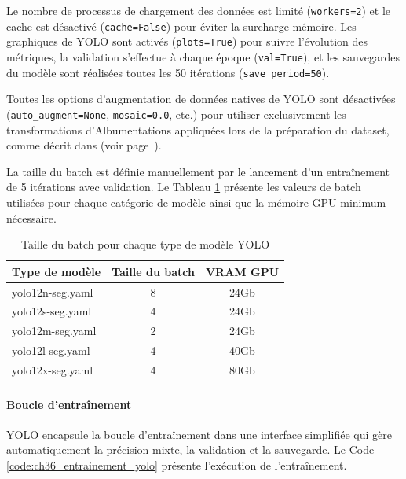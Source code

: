 Le nombre de processus de chargement des données est limité (\texttt{workers=2}) et le cache est désactivé (\texttt{cache=False}) pour éviter la surcharge mémoire. Les graphiques de YOLO sont activés (\texttt{plots=True}) pour suivre l'évolution des métriques, la validation s'effectue à chaque époque (\texttt{val=True}), et les sauvegardes du modèle sont réalisées toutes les 50 itérations (\texttt{save\_period=50}).

Toutes les options d'augmentation de données natives de YOLO sont désactivées (\texttt{auto\_augment=None}, \texttt{mosaic=0.0}, etc.) pour utiliser exclusivement les transformations d'Albumentations appliquées lors de la préparation du dataset, comme décrit dans \textit{} (voir page~\pageref{subsubsec:augmentation_donnees}).

La taille du batch est définie manuellement par le lancement d'un entraînement de 5 itérations avec validation. Le Tableau \ref{tab:ch36_batch_size_yolo} présente les valeurs de batch utilisées pour chaque catégorie de modèle ainsi que la mémoire GPU minimum nécessaire.

\begin{table}[H]
    \centering
    \begin{tabular}{@{}lcc@{}}
    \toprule
    \textbf{Type de modèle} & \textbf{Taille du batch} & \textbf{VRAM GPU}\\
    \midrule
    yolo12n-seg.yaml & 8 & 24Gb\\
    yolo12s-seg.yaml & 4 & 24Gb\\
    yolo12m-seg.yaml & 2 & 24Gb\\
    yolo12l-seg.yaml & 4 & 40Gb\\
    yolo12x-seg.yaml & 4 & 80Gb\\
    \bottomrule
    \end{tabular}
    \caption{Taille du batch pour chaque type de modèle YOLO}
    \label{tab:ch36_batch_size_yolo}
\end{table}

\paragraph{Boucle d'entraînement}
YOLO encapsule la boucle d'entraînement dans une interface simplifiée qui gère automatiquement la précision mixte, la validation et la sauvegarde. Le Code \ref{code:ch36_entrainement_yolo} présente l'exécution de l'entraînement.

